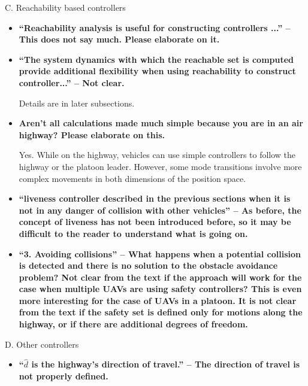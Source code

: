 \documentclass[submit]{aiaa-pretty}
\begin{document}
C. Reachability based controllers
\begin{itemize}
\item \textbf{``Reachability analysis is useful for constructing controllers ...'' – This does not say much. Please elaborate on it.}
\item \textbf{``The system dynamics with which the reachable set is computed provide additional flexibility when using reachability to construct controller...'' – Not clear.}

Details are in later subsections.

\item \textbf{Aren’t all calculations made much simple because you are in an air highway? Please elaborate on this.}

Yes. While on the highway, vehicles can use simple controllers to follow the highway or the platoon leader. However, some mode transitions involve more complex movements in both dimensions of the position space.

\item \textbf{``liveness controller described in the previous sections when it is not in any danger of collision with other vehicles'' – As before, the concept of liveness has not been introduced before, so it may be difficult to the reader to understand what is going on.}
\item \textbf{``3. Avoiding collisions'' – What happens when a potential collision is detected and there is no solution to the obstacle avoidance problem? Not clear from the text if the approach will work for the case when multiple UAVs are using safety controllers? This is even more interesting for the case of UAVs in a platoon. It is not clear from the text if the safety set is defined only for motions along the highway, or if there are additional degrees of freedom.}
\end{itemize}

D. Other controllers
\begin{itemize}
\item \textbf{``$\hat d$ is the highway’s direction of travel.'' – The direction of travel is not properly defined.}
\end{itemize}
\end{document}
